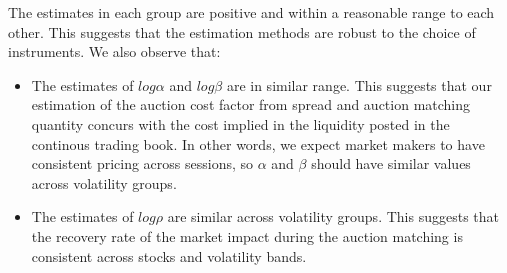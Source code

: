 \documentclass{article}
\begin{document}
The estimates in each group are positive and within a reasonable range to each other. This suggests that the estimation methods are robust to the choice of instruments. We also observe that:
\begin{itemize}
  \item The estimates of $log \alpha$ and $log \beta$ are in similar range. This suggests that our estimation of the auction cost factor from spread and auction matching quantity concurs with the cost implied in the liquidity posted in the continous trading book. In other words, we expect market makers to have consistent pricing across sessions, so $\alpha$ and $\beta$ should have similar values across volatility groups.
  \item The estimates of $log \rho$ are similar across volatility groups. This suggests that the recovery rate of the market impact during the auction matching is consistent across stocks and volatility bands.
\end{itemize}


\end{document}
